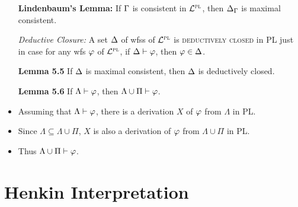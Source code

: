 \documentclass[a4paper, 11pt]{article} %
\begin{document}
\begin{itemize}
  \item[\bf Lindenbaum's Lemma:] If $\Gamma$ is consistent in $\mathcal{L}^{\textsc{pl}}$, then $\Delta_{\Gamma}$ is maximal consistent. 
  \item[\it Deductive Closure:] A set $\Delta$ of wfss of $\mathcal{L}^{\textsc{pl}}$ is \textsc{deductively closed} in PL just in case for any wfs $\varphi$ of $\mathcal{L}^{\textsc{pl}}$, if $\Delta\vdash\varphi$, then $\varphi\in\Delta$.
  \item[\bf Lemma 5.5] If $\Delta$ is maximal consistent, then $\Delta$ is deductively closed.
  \item[\bf Lemma 5.6] If $\Lambda\vdash\varphi$, then $\Lambda\cup\Pi\vdash\varphi$.
    \item Assuming that $\Lambda\vdash\varphi$, there is a derivation $X$ of $\varphi$ from $\Lambda$ in PL.
    \item Since $\Lambda\subseteq\Lambda\cup\Pi$, $X$ is also a derivation of $\varphi$ from $\Lambda\cup\Pi$ in PL.
    \item Thus $\Lambda\cup\Pi\vdash\varphi$. 
\end{itemize}





\section*{Henkin Interpretation}
\end{document}
